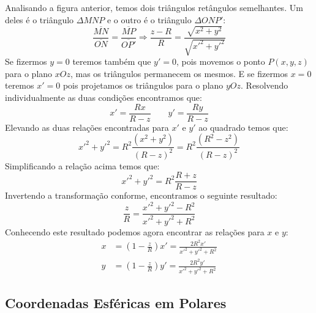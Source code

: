 Analisando a figura anterior, temos dois triângulos 
retângulos semelhantes. Um deles é o triângulo $\Delta MNP$ 
e o outro é o triângulo $\Delta ONP'$:
%
\begin{equation}
\frac{\overline{MN}}{\overline{ON}} = 
\frac{\overline{MP}}{\overline{OP'}} 
\Rightarrow
\frac{z-R}{R} = \frac{\sqrt{x^2 + y^2}}
{\sqrt{{x'}^2 + {y'}^2}}
\end{equation}
%
Se fizermos $y = 0$ teremos também que $y' = 0$, pois 
movemos o ponto $P(x,y,z)$ para o plano $xOz$, mas os 
triângulos permanecem os mesmos. E se fizermos $x = 0$ 
teremos $x' = 0$ pois projetamos os triângulos para 
o plano $yOz$. Resolvendo individualmente as duas
condições encontramos que:
%
\begin{equation}
x' = \frac{Rx}{R - z} \qquad y' = \frac{Ry}{R - z}
\end{equation}
%
Elevando as duas relações encontradas para $x'$ e $y'$ 
ao quadrado temos que:
%
\begin{equation}
{x'}^2 + {y'}^2 = R^2\frac{(x^2 + y^2)}{(R-z)^2} 
= R^2\frac{(R^2 - z^2)}{(R-z)^2}
\end{equation}
%
Simplificando a relação acima temos que:
%
\[
{x'}^2 + {y'}^2  = R^2\frac{R + z}{R - z}
\]
%
Invertendo a transformação conforme, encontramos 
o seguinte resultado:
%
\[
\frac{z}{R} = \frac{{x'}^2 + {y'}^2 - R^2}
{{x'}^2 + {y'}^2 + R^2}
\]
%
Conhecendo este resultado podemos agora encontrar 
as relações para $x$ e $y$:
%
\begin{align}
x &= \left(1 - \frac{z}{R}\right)x' 
= \frac{2R^2x'}{{x'}^2 + {y'}^2 + R^2} 
\\
y &= \left(1 - \frac{z}{R}\right)y' 
= \frac{2R^2y'}{{x'}^2 + {y'}^2 + R^2}
\end{align}



\subsection{Coordenadas Esféricas em Polares}

